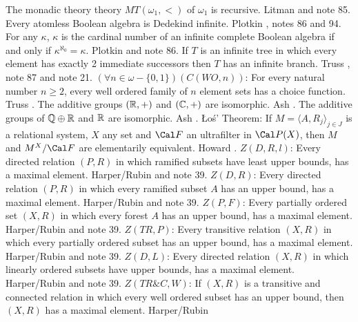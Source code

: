 \medskip
{} The monadic theory theory $MT(\omega_1,<)$ of
$\omega_1$ is recursive.  \ac{Litman} \cite{1976} and note 85.
\medskip
{} Every atomless Boolean algebra is Dedekind
infinite.  \ac{Plotkin} \cite{1976}, notes 86 and 94.
\medskip
{} For any $\kappa$, $\kappa$ is the cardinal number
of an infinite complete Boolean algebra if and only if $\kappa^{\aleph_0}
= \kappa $.  \ac{Plotkin} \cite{1976} and note 86.
\medskip
{}  If $T$ is an infinite tree in
which every element has exactly 2 immediate successors then $T$ has an
infinite branch.  \ac{Truss} \cite{1975}, note 87 and note 21.
\medskip
{} $(\forall n\in\omega-\{0,1\})(C(WO,n))$: For every
natural number $n\ge 2$, every well ordered family of $n$ element sets
has a choice function.  \ac{Truss} \cite{1975}.
\medskip
{} The additive groups $({\Bbb R},+)$ and
$({\Bbb C},+)$ are  isomorphic.  \ac{Ash} \cite{1975}.
\medskip
{} The additive groups of $\Bbb Q\oplus\Bbb R$
and $\Bbb R$ are isomorphic.  \ac{Ash} \cite{1975}.
\medskip
{} \L o\'s' Theorem: If $M=\langle A,R_j\rangle_{j\in
J}$ is a relational system, $X$ any set and ${\Cal F}$ an ultrafilter
in ${\Cal P}(X)$, then $M$ and $M^{X}/{\Cal F}$ are elementarily
equivalent.  \ac{Howard} \cite{1975}. 
\medskip
{} $Z(D,R,l)$: Every directed relation $(P,R)$ in which
ramified subsets have least upper bounds, has a maximal element.
\ac{Harper/Rubin} \cite{1976} and note 39.
\medskip
{} $Z(D,R)$: Every directed relation $(P,R)$ in which
every ramified subset $A$ has an upper bound, has a maximal element.
\ac{Harper/Rubin}  \cite{1976} and note 39.
\medskip
{} $Z(P,F)$: Every partially ordered set $(X,R)$ in
which every forest $A$ has an upper bound, has a maximal element.
\ac{Harper/Rubin} \cite{1976} and note 39.
\medskip
{} $Z(TR,P)$: Every transitive relation $(X,R)$ in
which  every partially ordered subset has an upper bound, has a maximal
element.  \ac{Harper/Rubin} \cite{1976} and note 39.
\medskip
{} $Z(D,L)$: Every directed relation $(X,R)$ in which
linearly ordered subsets have upper bounds, has a maximal element.
\ac{Harper/Rubin} \cite{1976} and note 39.
\medskip
{} $Z(TR\&C,W)$: If $(X,R)$ is a transitive and
connected relation in which every well ordered subset has an upper
bound, then $(X,R)$ has a maximal element.  \ac{Harper/Rubin} \cite{1976}
